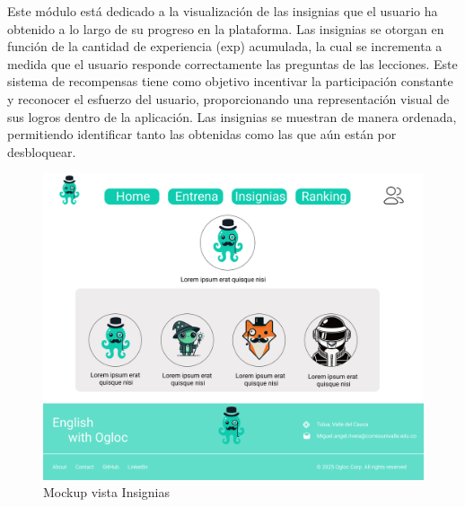 Este módulo está dedicado a la visualización de las insignias que el usuario ha obtenido a lo largo de su progreso en la plataforma. Las insignias se otorgan en función de la cantidad de experiencia (exp) acumulada, la cual se incrementa a medida que el usuario responde correctamente las preguntas de las lecciones. Este sistema de recompensas tiene como objetivo incentivar la participación constante y reconocer el esfuerzo del usuario, proporcionando una representación visual de sus logros dentro de la aplicación. Las insignias se muestran de manera ordenada, permitiendo identificar tanto las obtenidas como las que aún están por desbloquear.

\begin{figure}[H]
  \centering
  \includegraphics[width=0.6\linewidth]{Imagenes/Vista insignias.png}
  \caption{Mockup vista Insignias}
  \label{fig:ER}
\end{figure}